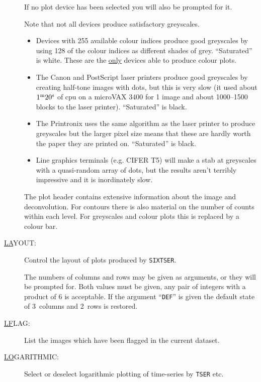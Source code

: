 \begin{description}
If no plot device has been selected you will also be prompted for it.

Note that not all devices produce satisfactory greyscales.
\begin{itemize}
\item Devices with 255 available colour indices produce good greyscales by 
using 128 of the colour indices as different shades of grey.
``Saturated'' is white.  These are the \underline{only} devices able to
produce colour plots.

\item The Canon and PostScript laser printers produce good greyscales by
creating half-tone images with dots, but this is very slow (it used
about $1^{\rm m}20^{\rm s}$ of cpu on a microVAX 3400 for 1 image and
about 1000--1500 blocks to the laser printer). ``Saturated'' is black.

\item The Printronix uses the same
algorithm as the laser printer to produce greyscales but the larger
pixel size means that these are hardly worth the paper they are printed
on.  ``Saturated'' is black.

\item Line graphics terminals (e.g. CIFER T5) will make a stab at
greyscales with a quasi-random array of dots, but the results aren't
terribly impressive and it is inordinately slow.

\end{itemize}

The plot header contains extensive information about the image and
deconvolution. For contours there is also material on the number of
counts within each level.  For greyscales and colour plots this is
replaced by a colour bar.

\item[\underline{LA}YOUT: ] \label{la}
Control the layout of plots produced by {\tt SIXTSER}.

The numbers of columns and rows may be given as arguments, or they will
be prompted for. Both values must be given, any pair of integers with a
product of 6 is acceptable. If the argument ``{\tt DEF}'' is given the
default state of 3~columns and 2~rows is restored.

\item[\underline{LF}LAG: ] \label{lf}
List the images which have been flagged in the current dataset.

\item[\underline{LO}GARITHMIC: ] \label{lo}
Select or deselect logarithmic plotting of time-series by {\tt TSER}
etc.


\end{description}
